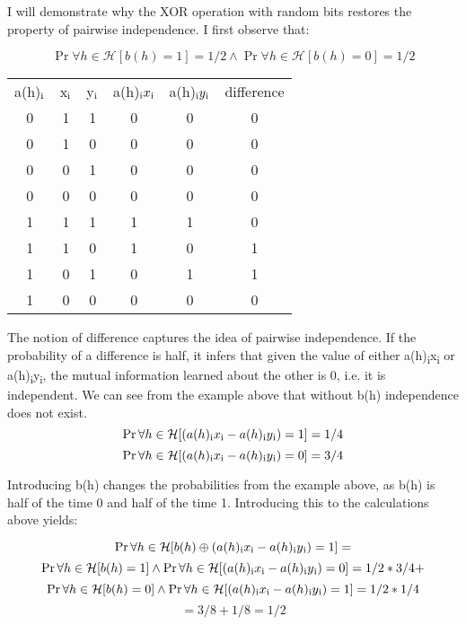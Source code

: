 \documentclass[11pt]{article}
\begin{document}
\begin{flushleft}
I will demonstrate why the XOR operation with random bits restores the property of pairwise independence. 
I first observe that:

$$\Pr\forall h \in \mathcal{H} [b(h) = 1] = 1/2 \wedge \Pr\forall h \in \mathcal{H} [b(h) = 0] = 1/2$$

\begin{center}
\begin{tabular}{ |c|c|c|c|c|c| } 
 \hline
 a(h)$\textsubscript{i}$ & x$\textsubscript{i}$ & y$\textsubscript{i}$ & a(h)$\textsubscript{i}x\textsubscript{i}$ & a(h)$\textsubscript{i}y\textsubscript{i}$ & difference \\ 
 0 & 1 & 1 & 0 & 0 & 0   \\ 
 0 & 1 & 0 & 0 & 0 & 0   \\ 
 0 & 0 & 1 & 0 & 0 & 0   \\ 
 0 & 0 & 0 & 0 & 0 & 0   \\ 
 1 & 1 & 1 & 1 & 1 & 0   \\ 
 1 & 1 & 0 & 1 & 0 & 1   \\ 
 1 & 0 & 1 & 0 & 1 & 1   \\ 
 1 & 0 & 0 & 0 & 0 & 0   \\ 
 \hline
\end{tabular}
\end{center}
The notion of difference captures the idea of pairwise independence. If the probability of a difference is half, it infers that given the value of either a(h)\textsubscript{i}x\textsubscript{i} or a(h)\textsubscript{i}y\textsubscript{i}, the mutual information learned about the other is 0, i.e. it is independent. We can see from the example above that without b(h) independence does not exist.
$$\Pr\forall h \in \mathcal{H} [(a(h)\textsubscript{i}x\textsubscript{i} - a(h)\textsubscript{i}y\textsubscript{i}) = 1] = 1/4$$
$$\Pr\forall h \in \mathcal{H} [(a(h)\textsubscript{i}x\textsubscript{i} - a(h)\textsubscript{i}y\textsubscript{i}) = 0] = 3/4$$

Introducing b(h) changes the probabilities from the example above, as b(h) is half of the time 0 and half of the time 1. Introducing this to the calculations above yields:

$$\Pr\forall h \in \mathcal{H} [b(h) \oplus (a(h)\textsubscript{i}x\textsubscript{i} - a(h)\textsubscript{i}y\textsubscript{i}) = 1] =$$ 
$$ \Pr\forall h \in \mathcal{H} [b(h) = 1] \wedge \Pr\forall h \in \mathcal{H} [(a(h)\textsubscript{i}x\textsubscript{i} - a(h)\textsubscript{i}y\textsubscript{i}) = 0] = 1/2 * 3/4 + $$
$$ \Pr\forall h \in \mathcal{H} [b(h) = 0] \wedge \Pr\forall h \in \mathcal{H} [(a(h)\textsubscript{i}x\textsubscript{i} - a(h)\textsubscript{i}y\textsubscript{i}) = 1] = 1/2 * 1/4 $$ $$ = 3/8 + 1/8 = 1/2 $$


\end{flushleft}
\end{document}
